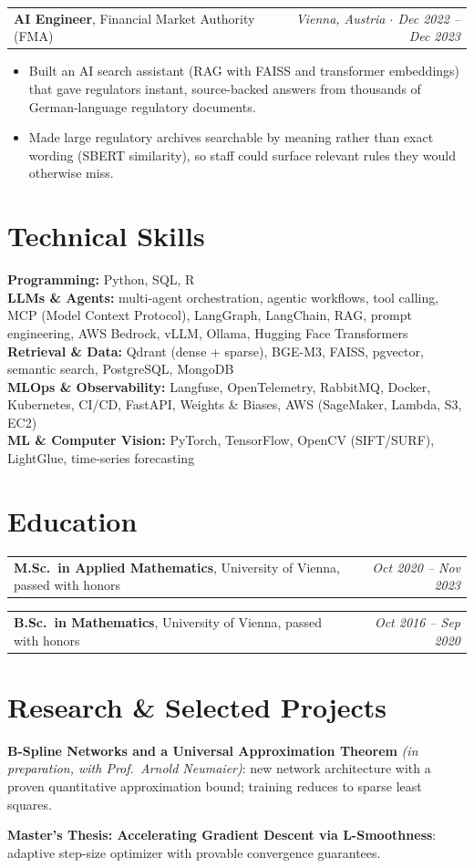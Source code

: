 \documentclass[10pt,a4paper]{article}
\makeatletter
\newcommand{\role}[3]{\par\vspace{3pt}\begin{tabularx}{\linewidth}{@{}X r@{}}\textbf{#1}, #2 & \textit{#3}\end{tabularx}\par}
\newcommand{\edu}[3]{\begin{tabularx}{\linewidth}{@{}X r@{}}\textbf{#1}, #2 & \textit{#3}\end{tabularx}\par}
\makeatother
\begin{document}
\role{AI Engineer}{Financial Market Authority (FMA)}{Vienna, Austria $\cdot$ Dec 2022 -- Dec 2023}\begin{itemize}
\item Built an AI search assistant (RAG with FAISS and transformer embeddings) that gave regulators instant, source-backed answers from thousands of German-language regulatory documents.
\item Made large regulatory archives searchable by meaning rather than exact wording (SBERT similarity), so staff could surface relevant rules they would otherwise miss.
\end{itemize}

\section{Technical Skills}
\textbf{Programming:} Python, SQL, R\\
\textbf{LLMs \& Agents:} multi-agent orchestration, agentic workflows, tool calling, MCP (Model Context Protocol), LangGraph, LangChain, RAG, prompt engineering, AWS Bedrock, vLLM, Ollama, Hugging Face Transformers\\
\textbf{Retrieval \& Data:} Qdrant (dense + sparse), BGE-M3, FAISS, pgvector, semantic search, PostgreSQL, MongoDB\\
\textbf{MLOps \& Observability:} Langfuse, OpenTelemetry, RabbitMQ, Docker, Kubernetes, CI/CD, FastAPI, Weights \& Biases, AWS (SageMaker, Lambda, S3, EC2)\\
\textbf{ML \& Computer Vision:} PyTorch, TensorFlow, OpenCV (SIFT/SURF), LightGlue, time-series forecasting

\section{Education}
\edu{M.Sc.\ in Applied Mathematics}{University of Vienna, passed with honors}{Oct 2020 -- Nov 2023}
\edu{B.Sc.\ in Mathematics}{University of Vienna, passed with honors}{Oct 2016 -- Sep 2020}

\section{Research \& Selected Projects}
\textbf{B-Spline Networks and a Universal Approximation Theorem} \textit{(in preparation, with Prof.\ Arnold Neumaier)}: new network architecture with a proven quantitative approximation bound; training reduces to sparse least squares.\par\vspace{2pt}
\textbf{Master's Thesis: Accelerating Gradient Descent via L-Smoothness}: adaptive step-size optimizer with provable convergence guarantees.
\end{document}
